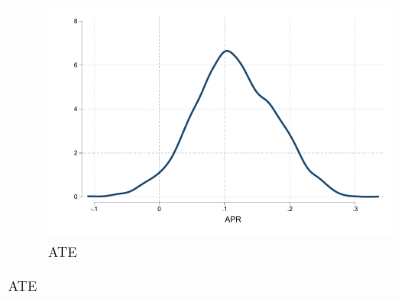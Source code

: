 \begin{appendix}
\begin{figure}[!h]
\begin{center}
\begin{subfigure}{.35\textwidth}
        \includegraphics[width=\textwidth]{Figuras/he_dist_tau_hat_eff.pdf}
        \caption{ATE}
    \end{subfigure} 
    \end{center}
\end{figure}


\end{appendix}
